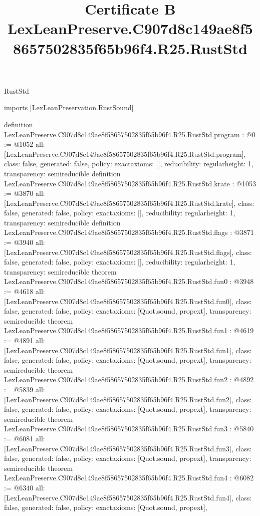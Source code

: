 \begin{lexlean}{RustStd}
\title{Certificate B LexLeanPreserve.C907d8c149ae8f58657502835f65b96f4.R25.RustStd}
\begin{coremodule}
imports [LexLeanPreservation.RustSound]

definition LexLeanPreserve.C907d8c149ae8f58657502835f65b96f4.R25.RustStd.program : @0 := @1052 {
  all: [LexLeanPreserve.C907d8c149ae8f58657502835f65b96f4.R25.RustStd.program],
  class: false,
  generated: false,
  policy: exact{axioms: []},
  reducibility: regular{height: 1},
  transparency: semireducible
}
definition LexLeanPreserve.C907d8c149ae8f58657502835f65b96f4.R25.RustStd.krate : @1053 := @3870 {
  all: [LexLeanPreserve.C907d8c149ae8f58657502835f65b96f4.R25.RustStd.krate],
  class: false,
  generated: false,
  policy: exact{axioms: []},
  reducibility: regular{height: 1},
  transparency: semireducible
}
definition LexLeanPreserve.C907d8c149ae8f58657502835f65b96f4.R25.RustStd.flags : @3871 := @3940 {
  all: [LexLeanPreserve.C907d8c149ae8f58657502835f65b96f4.R25.RustStd.flags],
  class: false,
  generated: false,
  policy: exact{axioms: []},
  reducibility: regular{height: 1},
  transparency: semireducible
}
theorem LexLeanPreserve.C907d8c149ae8f58657502835f65b96f4.R25.RustStd.fun0 : @3948 := @4618 {
  all: [LexLeanPreserve.C907d8c149ae8f58657502835f65b96f4.R25.RustStd.fun0],
  class: false,
  generated: false,
  policy: exact{axioms: [Quot.sound, propext]},
  transparency: semireducible
}
theorem LexLeanPreserve.C907d8c149ae8f58657502835f65b96f4.R25.RustStd.fun1 : @4619 := @4891 {
  all: [LexLeanPreserve.C907d8c149ae8f58657502835f65b96f4.R25.RustStd.fun1],
  class: false,
  generated: false,
  policy: exact{axioms: [Quot.sound, propext]},
  transparency: semireducible
}
theorem LexLeanPreserve.C907d8c149ae8f58657502835f65b96f4.R25.RustStd.fun2 : @4892 := @5839 {
  all: [LexLeanPreserve.C907d8c149ae8f58657502835f65b96f4.R25.RustStd.fun2],
  class: false,
  generated: false,
  policy: exact{axioms: [Quot.sound, propext]},
  transparency: semireducible
}
theorem LexLeanPreserve.C907d8c149ae8f58657502835f65b96f4.R25.RustStd.fun3 : @5840 := @6081 {
  all: [LexLeanPreserve.C907d8c149ae8f58657502835f65b96f4.R25.RustStd.fun3],
  class: false,
  generated: false,
  policy: exact{axioms: [Quot.sound, propext]},
  transparency: semireducible
}
theorem LexLeanPreserve.C907d8c149ae8f58657502835f65b96f4.R25.RustStd.fun4 : @6082 := @6340 {
  all: [LexLeanPreserve.C907d8c149ae8f58657502835f65b96f4.R25.RustStd.fun4],
  class: false,
  generated: false,
  policy: exact{axioms: [Quot.sound, propext]},
}
\end{coremodule}
\end{lexlean}
